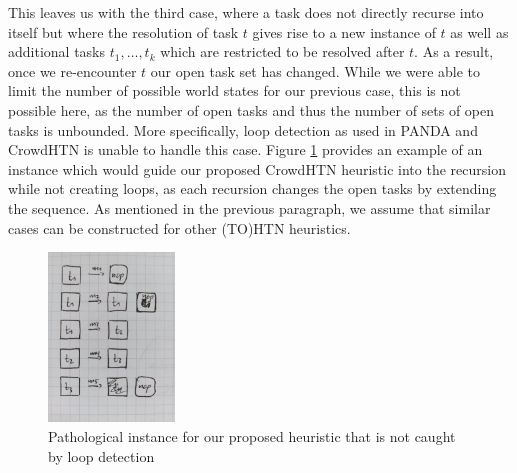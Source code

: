 This leaves us with the third case, where a task does not directly recurse into itself but where the resolution of task $t$ gives rise to a new instance of $t$ as well as additional tasks $t_1, \ldots, t_k$ which are restricted to be resolved after $t$. As a result, once we re-encounter $t$ our open task set has changed. While we were able to limit the number of possible world states for our previous case, this is not possible here, as the number of open tasks and thus the number of sets of open tasks is unbounded. More specifically, loop detection as used in PANDA and CrowdHTN is unable to handle this case. Figure \ref{figure: pathological heuristic loop} provides an example of an instance which would guide our proposed CrowdHTN heuristic into the recursion while not creating loops, as each recursion changes the open tasks by extending the sequence. As mentioned in the previous paragraph, we assume that similar cases can be constructed for other (TO)HTN heuristics.
\begin{figure}
	\caption{Pathological instance for our proposed heuristic that is not caught by loop detection}
	\label{figure: pathological heuristic loop}
	\centering
	\includegraphics[width=0.3\textwidth]{images/prelim/loop_detection_pathological}
\end{figure}

